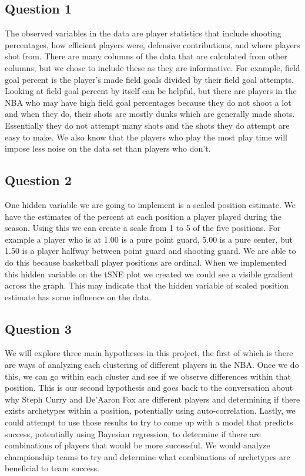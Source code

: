 \documentclass[12pt, letterpaper, titlepage]{article}
\begin{document}
\subsection{Question 1}
The observed variables in the data are player statistics that include shooting
percentages, how efficient players were, defensive contributions, and where
players shot from.  There are many columns of the data that are calculated from
other columns, but we chose to include these as they are informative.  For
example, field goal percent is the player's made field goals divided by their
field goal attempts.  Looking at field goal percent by itself can be helpful, but
there are players in the NBA who may have high field goal percentages because
they do not shoot a lot and when they do, their shots are mostly dunks which are
generally made shots.  Essentially they do not attempt many shots and the shots
they do attempt are easy to make. We also know that the players who play the most
play time will impose less noise on the data set than players who don’t.

\subsection{Question 2}
One hidden variable we are going to implement is a scaled position estimate. We
have the estimates of the percent at each position a player played during the
season.  Using this we can create a scale from 1 to 5 of the five positions.  For
example a player who is at 1.00 is a pure point guard, 5.00 is a pure center,
but 1.50 is a player halfway between point guard and shooting guard.  We are able
to do this because basketball player positions are ordinal. When we implemented 
this hidden variable on the tSNE plot we created we could see a visible gradient across 
the graph. This may indicate that the hidden variable of scaled position estimate has some influence on the data.

\subsection{Question 3}
We will explore three main hypotheses in this project, the first of which is there are
ways of analyzing each clustering of different players in the NBA.  Once we do this, we
can go within each cluster and see if we observe differences within that position. 
This is our second hypothesis and goes back to the conversation about why Steph Curry
and De'Aaron Fox are different players and determining if there exists archetypes
within a position, potentially using auto-correlation.  Lastly, we could attempt to use
those results to try to come up with a model that predicts success, potentially using
Bayesian regression, to determine if there are combinations of players that would be
more successful.  We would analyze championship teams to try and determine what
combinations of archetypes are beneficial to team success.
\end{document}
